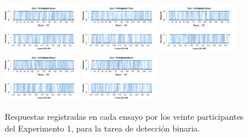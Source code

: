 \documentclass[a4paper ]{article}
\begin{document}
\begin{figure}[th]
\includegraphics[width=0.3\textwidth]{Figures/Response_Exp1_P16} \includegraphics[width=0.3\textwidth]{Figures/Response_Exp1_P17} \includegraphics[width=0.3\textwidth]{Figures/Response_Exp1_P18}
\includegraphics[width=0.3\textwidth]{Figures/Response_Exp1_P19} \includegraphics[width=0.3\textwidth]{Figures/Response_Exp1_P20} 
\caption[Respuesta binaria registrada ensayo a ensayo; Experimento 1]{Respuestas registradas en cada ensayo por los veinte participantes del Experimento 1, para la tarea de detección binaria.}
\label{fig:Response_E1}
\end{figure}
\end{document}
